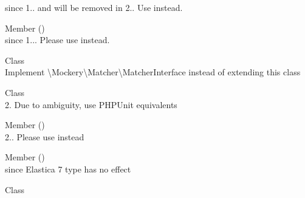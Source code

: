 \begin{DoxyRefList}
\label{deprecated__deprecated000107}%
%
since 1.. and will be removed in 2.. Use  instead.  
\item[Member \doxylink{interface_mockery_1_1_legacy_mock_interface_a6470ac3a69c5079d5a2a181c0040e828}{Mockery\textbackslash{}Legacy\+Mock\+Interface\+::should\+Defer\+Missing} ()]\hfill \\
\label{deprecated__deprecated000108}%
%
since 1... Please use  instead. 
\item[Class \doxylink{class_mockery_1_1_matcher_1_1_matcher_abstract}{Mockery\textbackslash{}Matcher\textbackslash{}Matcher\+Abstract} ]\hfill \\
\label{deprecated__deprecated000109}%
%
Implement \textbackslash{}\+Mockery\textbackslash{}\+Matcher\textbackslash{}\+Matcher\+Interface instead of extending this class  
\item[Class \doxylink{class_mockery_1_1_matcher_1_1_must_be}{Mockery\textbackslash{}Matcher\textbackslash{}Must\+Be} ]\hfill \\
\label{deprecated__deprecated000110}%
%
2. Due to ambiguity, use PHPUnit equivalents  
\item[Member \doxylink{class_mockery_1_1_mock_aeb8d7e5556f8af62310d10ea58de8793}{Mockery\textbackslash{}Mock\+::should\+Defer\+Missing} ()]\hfill \\
\label{deprecated__deprecated000111}%
%
2.. Please use  instead 
\item[Member \doxylink{class_monolog_1_1_formatter_1_1_elastica_formatter_a655e454443565ba87052d9f26de3f34f}{Monolog\textbackslash{}Formatter\textbackslash{}Elastica\+Formatter\+::get\+Type} ()]\hfill \\
\label{deprecated__deprecated000113}%
%
since Elastica 7 type has no effect  
\item[Class \doxylink{class_monolog_1_1_formatter_1_1_flowdock_formatter}{Monolog\textbackslash{}Formatter\textbackslash{}Flowdock\+Formatter} ]\hfill \\
\label{deprecated__deprecated000114}%

\end{DoxyRefList}
